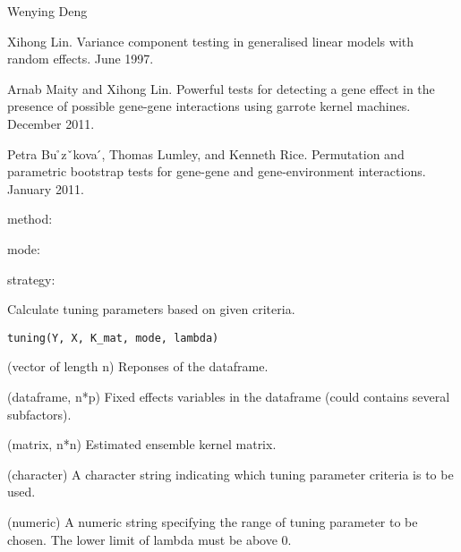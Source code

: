 \documentclass[a4paper]{book}
\begin{document}
%
\begin{Author}\relax
Wenying Deng
\end{Author}
%
\begin{References}\relax
Xihong Lin. Variance component testing in generalised linear
models with random effects. June 1997.

Arnab Maity and Xihong Lin. Powerful tests for detecting a gene effect in
the presence of possible gene-gene interactions using garrote kernel
machines. December 2011.

Petra Bu ̊zˇkova ́, Thomas Lumley, and Kenneth Rice. Permutation and
parametric bootstrap tests for gene-gene and gene-environment interactions.
January 2011.
\end{References}
%
\begin{SeeAlso}\relax
method: 

mode: 

strategy: 
\end{SeeAlso}
%
\begin{Description}\relax
Calculate tuning parameters based on given criteria.
\end{Description}
%
\begin{Usage}
\begin{verbatim}
tuning(Y, X, K_mat, mode, lambda)
\end{verbatim}
\end{Usage}
%
\begin{Arguments}
\begin{ldescription}
\item[\code{Y}] (vector of length n) Reponses of the dataframe.

\item[\code{X}] (dataframe, n*p) Fixed effects variables in the dataframe (could
contains several subfactors).

\item[\code{K\_mat}] (matrix, n*n) Estimated ensemble kernel matrix.

\item[\code{mode}] (character) A character string indicating which tuning parameter
criteria is to be used.

\item[\code{lambda}] (numeric) A numeric string specifying the range of tuning parameter 
to be chosen. The lower limit of lambda must be above 0.
\end{ldescription}
\end{Arguments}
\end{document}
